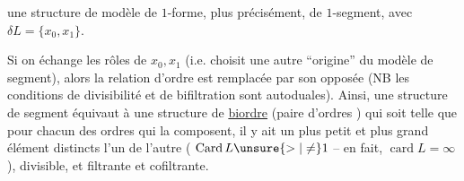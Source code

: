 
une structure de modèle de $1$-forme, \unsure{\{}plus précisément, de $1$-segment\unsure{\}}, avec $\delta L=\{x_0,x_1\}$.

Si on échange les rôles de $x_0,x_1$ (i.e. choisit une autre ``origine'' du modèle de segment), alors la relation d'ordre est remplacée par son opposée (NB les conditions de divisibilité et de bifiltration  sont autoduales). Ainsi, une structure de  segment équivaut à une structure de \uline{biordre} (paire d'ordres ) qui soit telle que pour chacun  des ordres qui la composent, il y ait un plus petit et plus grand élément distincts l'un de l'autre ( $\operatorname{Card}L\unsure{>|\ne}1$ -- en fait, $\operatorname{card}L=\infty$), divisible, et  filtrante et cofiltrante.


